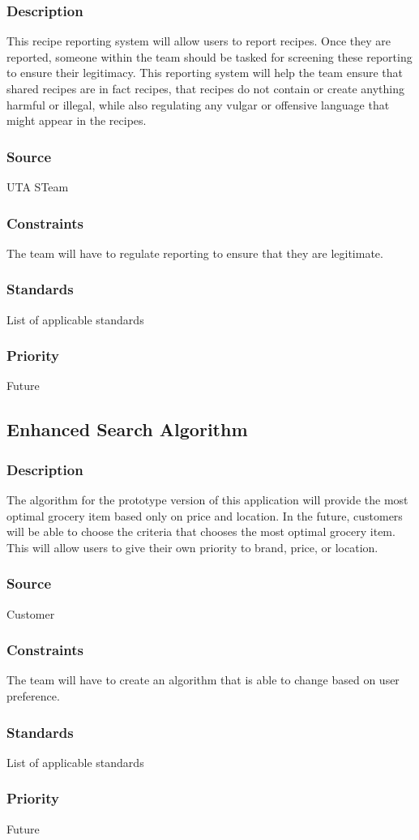 \subsubsection{Description}
This recipe reporting system will allow users to report recipes. Once they are reported, someone within the team should be tasked for screening these reporting to ensure their legitimacy. This reporting system will help the team ensure that shared recipes are in fact recipes, that recipes do not contain or create anything harmful or illegal, while also regulating any vulgar or offensive language that might appear in the recipes.
\subsubsection{Source}
UTA STeam
\subsubsection{Constraints}
The team will have to regulate reporting to ensure that they are legitimate.
\subsubsection{Standards}
List of applicable standards
\subsubsection{Priority}
Future

\subsection{Enhanced Search Algorithm}
\subsubsection{Description}
The algorithm for the prototype version of this application  will provide the most optimal grocery item based only on price and location. In the future, customers will be able to choose the criteria that chooses the most optimal grocery item. This will allow users to give their own priority to brand, price, or location. 
\subsubsection{Source}
Customer
\subsubsection{Constraints}
The team will have to create an algorithm that is able to change based on user preference.
\subsubsection{Standards}
List of applicable standards
\subsubsection{Priority}
Future